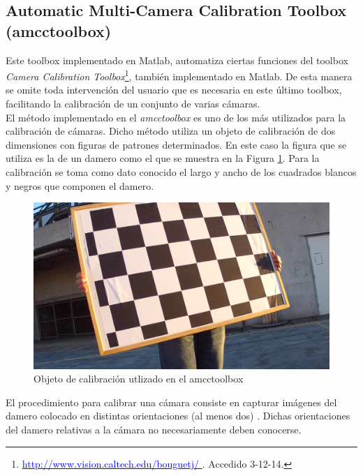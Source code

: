  
\subsection{Automatic Multi-Camera Calibration Toolbox (amcctoolbox)}


Este toolbox  \cite{amcctoolbox} implementado en Matlab, automatiza ciertas funciones del  toolbox \textit{Camera Calibration Toolbox}\footnote{\textcolor{blue}{\underline{http://www.vision.caltech.edu/bouguetj/   }}. Accedido 3-12-14.}, también implementado en Matlab. De esta manera se omite toda intervención del usuario que es necesaria en este último toolbox, facilitando la calibración de un conjunto de varias cámaras.\\

El método implementado en el \textit{amcctoolbox} es uno de los más utilizados para la calibración de cámaras. Dicho método utiliza un objeto de calibración de dos dimensiones con figuras de patrones determinados. En este caso la figura que se utiliza es la de un damero como el que se muestra en la Figura \ref{fig: tablero}. Para la calibración se toma como dato conocido el largo y ancho de los cuadrados blancos y negros que componen el damero.

\begin{figure}[ht!]
\begin{center}
\includegraphics[scale=0.075]{img/calibracion/tablero.jpg}
\end{center}

\caption{Objeto de calibración utlizado en el amcctoolbox}
\label{fig: tablero}
\end{figure}


El procedimiento para calibrar una cámara consiste en capturar imágenes del damero colocado en distintas orientaciones (al menos dos) \cite{zhang_articulo}. Dichas orientaciones del damero relativas a la cámara no necesariamente deben conocerse.\\

